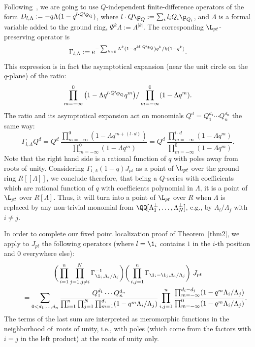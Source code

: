 Following~\cite{Givental:perm4}, we are going to use $Q$-independent finite-difference operators of the form $D_{l,\Lambda}:=-q \Lambda (1-q^{l\cdot Q\p_Q})$, where $l\cdot Q\p_Q:=\sum_i l_iQ_i\p_{Q_i}$, and $\Lambda$ is a formal variable added to the ground ring, $\Psi^k\Lambda:=\Lambda^{|k|}$. The corresponding $\L_{pt}$-preserving operator is
\[
\Gamma_{l,\Lambda}:= {\rm e}^{ -\sum_{k>0}\Lambda^k
(1-q^{kl\cdot Q\p_Q})q^k/k(1-q^k)}.
\]
This expression is in fact the asymptotical expansion (near the unit circle on the $q$-plane) of the ratio:
\[
\prod_{m=-\infty}^0\big(1-\Lambda q^{l\cdot Q\p_Q}q^m\big)/ \prod_{m=-\infty}^0(1-\Lambda q^m).
\]
The ratio and its asymptotical expansion act on monomials $Q^d=Q_1^{d_1}\cdots Q_n^{d_n}$ the same way:
\[
\Gamma_{l,\Lambda}Q^d= Q^d\ \frac{\prod_{m=-\infty}^0(1-\Lambda q^{m+(l\cdot d)})}{\prod_{m=-\infty}^0(1-\Lambda q^m)} = Q^d\ \frac{\prod_{m=-\infty}^{l\cdot d}(1-\Lambda q^m)}{\prod_{m=-\infty}^0(1-\Lambda q^m)}.
\]
Note that the right hand side is a rational function of $q$ with poles away from roots of unity. Considering $\Gamma_{l,\Lambda}(1-q)J_{pt}$ as a point of $\L_{pt}$ over the ground ring $R[[\Lambda]]$, we conclude therefore, that being a $Q$-series with coefficients which are rational function of $q$ with coefficients polynomial in $\Lambda$, it is a point of $\L_{pt}$ over $R[\Lambda]$. Thus, it will turn into a point of $\L_{pt}$ over $R$ when $\Lambda$ is replaced by any non-trivial monomial from $\QQ[\Lambda_1^{\pm},\dots,\Lambda_N^{\pm}]$, e.g., by $\Lambda_i/\Lambda_j$ with $i\neq j$.

In order to complete our fixed point localization proof of Theorem~\ref{thm2}, we apply to $J_{pt}$ the following operators (where $l=\1_i$ contains $1$ in the $i$-th position and $0$ everywhere else):
\begin{gather*}
\bigg(\prod_{i=1}^n\prod_{j=1, j\neq i}^N \Gamma^{-1}_{\1_i,\Lambda_i/\Lambda_j}\bigg) \bigg(\prod_{i,j=1}^n\Gamma_{\1_i-\1_j,\Lambda_i/\Lambda_j}\bigg)\ J_{pt}
\\ \qquad
{}=\sum_{0<d_1,\dots,d_n}\frac{Q_1^{d_1}\cdots Q_n^{d_n}}{\prod_{i=1}^n\prod_{j=1}^N\prod_{m=1}^{d_i}(1-q^m\Lambda_i/\Lambda_j)} \prod_{i,j=1}^n\frac{\prod_{m=-\infty}^{d_i-d_j}(1-q^m\Lambda_i/\Lambda_j)}{\prod_{m=-\infty}^0(1-q^m\Lambda_i/\Lambda_j)}.
\end{gather*}
The terms of the last sum are interpreted as meromorphic functions in the neighborhood of~roots of unity, i.e., with poles (which come from the factors with $i=j$ in the left product) at the roots of unity only.

